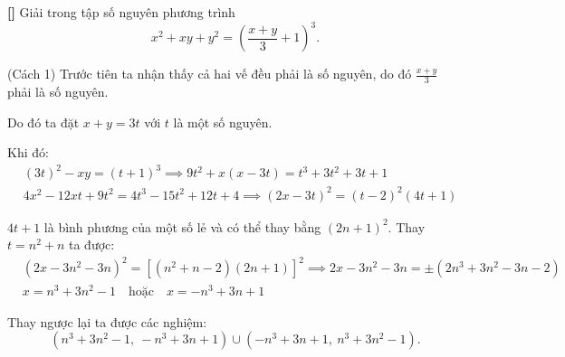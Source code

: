\documentclass[../04-diophantine-equations.tex]{subfiles}
\begin{document}
\begin{example*}\label{example:USA-2015-MO-P1}\textbf{[]}
	Giải trong tập số nguyên phương trình  
	\[
		x^2+xy+y^2 = \left(\frac{x+y}{3}+1\right)^3.
	\]
\end{example*}

\begin{soln}(Cách 1)\footnotemark
	Trước tiên ta nhận thấy cả hai vế đều phải là số nguyên, do đó $\frac{x+y}{3}$ phải là số nguyên.

	Do đó ta đặt $x+y = 3t$ với $t$ là một số nguyên.
	
	Khi đó:
	\[
		\begin{aligned}
			&(3t)^2 - xy = (t+1)^3 \implies 9t^2 + x (x - 3t) = t^3 + 3t^2 + 3t + 1\\
			&4x^2 - 12xt + 9t^2 = 4t^3 - 15t^2 + 12t + 4 \implies (2x - 3t)^2 = (t - 2)^2(4t + 1)
		\end{aligned}
	\]
	
	$4t+1$ là bình phương của một số lẻ và có thể thay bằng $(2n+1)^2.$
	Thay $t = n^2 + n$ ta được:
	\[
		\begin{aligned}
			&(2x - 3n^2 - 3n)^2 = [(n^2 + n - 2)(2n+1)]^2 \implies 2x - 3n^2 - 3n = \pm (2n^3 + 3n^2 -3n -2)\\
			&x = n^3 + 3n^2 - 1 \quad \text{hoặc} \quad x = -n^3 + 3n + 1
		\end{aligned}
	\]
	
	Thay ngược lại ta được các nghiệm: 
	\[
		(n^3 + 3n^2 - 1,\ -n^3 + 3n + 1) \cup (-n^3 + 3n + 1,\ n^3 + 3n^2 - 1).
	\]
\end{soln}

\end{document}
